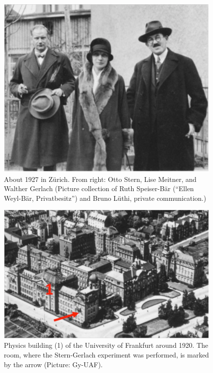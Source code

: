 \documentclass{article}
\begin{document}
\begin{figure}
\begin{center}
\includegraphics[scale=0.5]{figures/SternMeitnerGerlach}
\caption{About 1927 in Zürich. From right: Otto Stern, Lise Meitner, and Walther Gerlach (Picture collection of Ruth Speiser-Bär (``Ellen Weyl-Bär, Privatbesitz'') and Bruno Lüthi,  private communication.)}
\label{fig:SternMeitnerGerlach}
\end{center}
\end{figure}
%
\begin{figure}
\begin{center}
\includegraphics[scale=0.45]{figures/Physics_building}
\caption{Physics building (1) of the University of Frankfurt around 1920. The room, where the Stern-Gerlach experiment was performed, is marked by the arrow (Picture: Gy-UAF).}
\label{fig:physics_building}
\end{center}
\end{figure}
\end{document}
